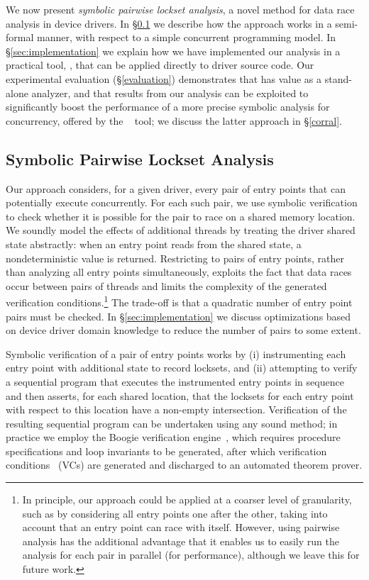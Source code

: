
We now present \emph{symbolic pairwise lockset analysis}, a novel method for data race analysis in device drivers.  In \S\ref{sec:symbolicpairwise} we describe how the approach works in a semi-formal manner, with respect to a simple concurrent programming model.  In \S\ref{sec:implementation} we explain how we have implemented our analysis in a practical tool, \whoop, that can be applied directly to driver source code.
%
Our experimental evaluation (\S\ref{evaluation}) demonstrates that \whoop has value as a stand-alone analyzer, and that results from our analysis can be exploited to significantly boost the performance of a more precise symbolic analysis for concurrency, offered by the \corral~\cite{lal2012corral} tool; we discuss the latter approach in \S\ref{corral}.

\subsection{Symbolic Pairwise Lockset Analysis}
\label{sec:symbolicpairwise}

Our approach considers, for a given driver, every pair of entry points that can potentially execute concurrently.  For each such pair, we use symbolic verification to check whether it is possible for the pair to race on a shared memory location. We soundly model the effects of additional threads by treating the driver shared state abstractly: when an entry point reads from the shared state, a nondeterministic value is returned.  Restricting to pairs of entry points, rather than analyzing all entry points simultaneously, exploits the fact that data races occur between pairs of threads and limits the complexity of the generated verification conditions.\footnote{In principle, our approach could be applied at a coarser level of granularity, such as by considering all entry points one after the other, taking into account that an entry point can race with itself. However, using pairwise analysis has the additional advantage that it enables us to easily run the analysis for each pair in parallel (for performance), although we leave this for future work.}
%
The trade-off is that a quadratic number of entry point pairs must be checked.  In \S\ref{sec:implementation} we discuss optimizations based on device driver domain knowledge to reduce the number of pairs to some extent.

Symbolic verification of a pair of entry points works by (i) instrumenting each entry point with additional state to record locksets, and (ii) attempting to verify a sequential program that executes the instrumented entry points in sequence and then asserts, for each shared location, that the locksets for each entry point with respect to this location have a non-empty intersection.  Verification of the resulting sequential program can be undertaken using any sound method; in practice we employ the Boogie verification engine~\cite{barnett2006boogie}, which requires procedure specifications and loop invariants to be generated, after which verification conditions~\cite{barnett2005weakest} (VCs) are generated and discharged to an automated theorem prover.

